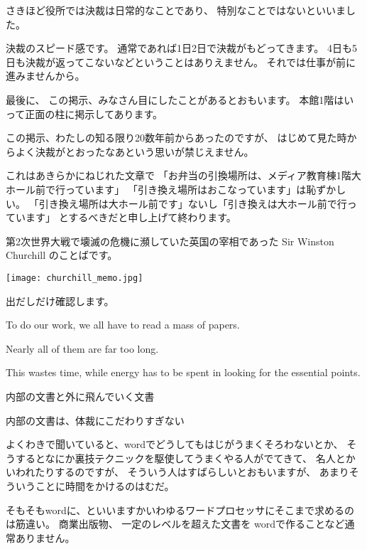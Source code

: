 \documentclass[uplatex,jis2004,dvipdfmx,12pt]{jsarticle}
\begin{document}
さきほど役所では決裁は日常的なことであり、
特別なことではないといいました。

決裁のスピード感です。
通常であれば1日2日で決裁がもどってきます。
4日も5日も決裁が返ってこないなどということはありえません。
それでは仕事が前に進みませんから。


最後に、
この掲示、みなさん目にしたことがあるとおもいます。
本館1階はいって正面の柱に掲示してあります。

この掲示、わたしの知る限り20数年前からあったのですが、
はじめて見た時からよく決裁がとおったなあという思いが禁じえません。

これはあきらかにねじれた文章で
「お弁当の引換場所は、メディア教育棟1階大ホール前で行っています」
「引き換え場所はおこなっています」は恥ずかしい。
「引き換え場所は大ホール前です」ないし「引き換えは大ホール前で行っています」
とするべきだと申し上げて終わります。



第2次世界大戦で壊滅の危機に瀕していた英国の宰相であった Sir Winston Churchill
のことばです。

\texttt{[image: churchill\_memo.jpg]}

出だしだけ確認します。

To do our work, we all have to read a mass of papers.

 Nearly all of them are far too long.

 This wastes time, while energy has to be spent in looking for the essential points.



内部の文書と外に飛んでいく文書

内部の文書は、体裁にこだわりすぎない

よくわきで聞いていると、wordでどうしてもはじがうまくそろわないとか、
そうするとなにか裏技テクニックを駆使してうまくやる人がでてきて、
名人とかいわれたりするのですが、
そういう人はすばらしいとおもいますが、
あまりそういうことに時間をかけるのはむだ。

そもそもwordに、といいますかいわゆるワードプロセッサにそこまで求めるのは筋違い。
商業出版物、
一定のレベルを超えた文書を
wordで作ることなど通常ありません。
\end{document}
